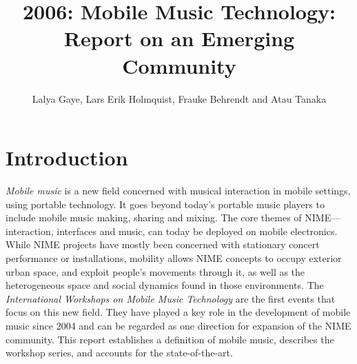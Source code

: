 
\graphicspath{ {mainmatter/Gaye_2006/} }
\title*{2006: Mobile Music Technology: Report on an Emerging Community}

\author{Lalya Gaye, Lars Erik Holmquist, Frauke Behrendt and Atau Tanaka}

%
%
\maketitle


\section{Introduction}

\textit{Mobile music} is a new field concerned with musical interaction in
mobile settings, using portable technology. It goes beyond today's portable music
players to include mobile music making, sharing and mixing. The core themes of
NIME---interaction, interfaces and music, can today be deployed on mobile
electronics. While NIME projects have mostly been concerned with stationary
concert performance or installations, mobility allows NIME concepts to occupy
exterior urban space, and exploit people's movements through it, as well as the
heterogeneous space and social dynamics found in those environments. The
\textit{International Workshops on Mobile Music Technology} are the first events
that focus on this new field. They have played a key role in the development of
mobile music since 2004 and can be regarded as one direction for expansion of the
NIME community. This report establishes a definition of mobile music, describes
the workshop series, and accounts for the state-of-the-art.

